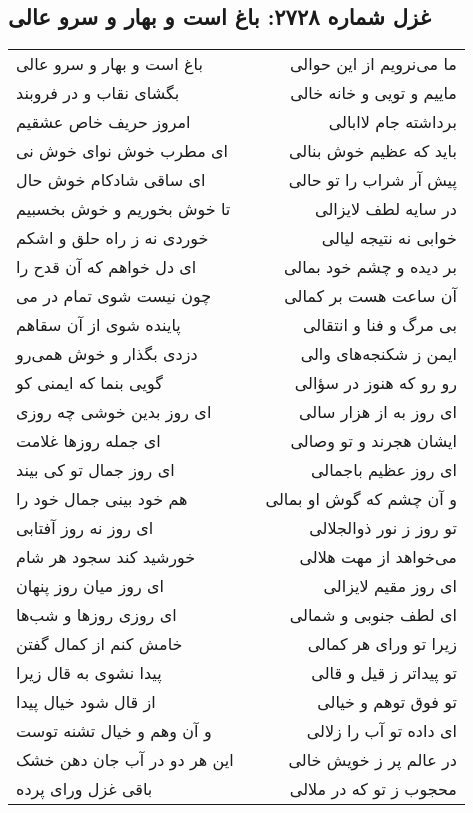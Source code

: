 \begin{center}
\section*{غزل شماره ۲۷۲۸: باغ است و بهار و سرو عالی}
\label{sec:2728}
\begin{longtable}{l p{0.5cm} r}
باغ است و بهار و سرو عالی
&&
ما می‌نرویم از این حوالی
\\
بگشای نقاب و در فروبند
&&
ماییم و تویی و خانه خالی
\\
امروز حریف خاص عشقیم
&&
برداشته جام لاابالی
\\
ای مطرب خوش نوای خوش نی
&&
باید که عظیم خوش بنالی
\\
ای ساقی شادکام خوش حال
&&
پیش آر شراب را تو حالی
\\
تا خوش بخوریم و خوش بخسبیم
&&
در سایه لطف لایزالی
\\
خوردی نه ز راه حلق و اشکم
&&
خوابی نه نتیجه لیالی
\\
ای دل خواهم که آن قدح را
&&
بر دیده و چشم خود بمالی
\\
چون نیست شوی تمام در می
&&
آن ساعت هست بر کمالی
\\
پاینده شوی از آن سقاهم
&&
بی مرگ و فنا و انتقالی
\\
دزدی بگذار و خوش همی‌رو
&&
ایمن ز شکنجه‌های والی
\\
گویی بنما که ایمنی کو
&&
رو رو که هنوز در سؤالی
\\
ای روز بدین خوشی چه روزی
&&
ای روز به از هزار سالی
\\
ای جمله روزها غلامت
&&
ایشان هجرند و تو وصالی
\\
ای روز جمال تو کی بیند
&&
ای روز عظیم باجمالی
\\
هم خود بینی جمال خود را
&&
و آن چشم که گوش او بمالی
\\
ای روز نه روز آفتابی
&&
تو روز ز نور ذوالجلالی
\\
خورشید کند سجود هر شام
&&
می‌خواهد از مهت هلالی
\\
ای روز میان روز پنهان
&&
ای روز مقیم لایزالی
\\
ای روزی روزها و شب‌ها
&&
ای لطف جنوبی و شمالی
\\
خامش کنم از کمال گفتن
&&
زیرا تو ورای هر کمالی
\\
پیدا نشوی به قال زیرا
&&
تو پیداتر ز قیل و قالی
\\
از قال شود خیال پیدا
&&
تو فوق توهم و خیالی
\\
و آن وهم و خیال تشنه توست
&&
ای داده تو آب را زلالی
\\
این هر دو در آب جان دهن خشک
&&
در عالم پر ز خویش خالی
\\
باقی غزل ورای پرده
&&
محجوب ز تو که در ملالی
\\
\end{longtable}
\end{center}
